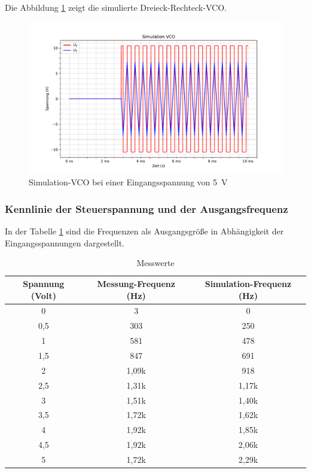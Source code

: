 Die Abbildung \ref{fig:VCO_5Volt_Simulation} zeigt die simulierte Dreieck-Rechteck-VCO.

\begin{figure}[H]
  \centering
  \includegraphics[width=0.8\linewidth]{Elektronik-Laborprotokoll_PLL/Plots/simulation-vco-5V.pdf}
  \caption{Simulation-VCO bei einer Eingangsspannung von \SI{5}{\volt}}
  \label{fig:VCO_5Volt_Simulation}
\end{figure}

\subsubsection{Kennlinie der Steuerspannung und der Ausgangsfrequenz}


In der Tabelle \ref{tab:VCO_Kennlinie_gemessen} sind die Frequenzen als Ausgangsgröße in Abhängigkeit der Eingangsspannungen dargestellt.


\begin{table}[htbp]
  \centering
  \caption{Messwerte}
  \label{tab:VCO_Kennlinie_gemessen}
  \begin{tabular}{ccc}
    \toprule
    Spannung (Volt) & Messung-Frequenz (Hz)&Simulation-Frequenz (Hz)\\
    \midrule
    0 & 3 & 0\\
    0,5 & 303 & 250\\
    1 & 581 & 478\\
    1,5 & 847 &691\\
    2 & 1,09k & 918 \\
    2,5 & 1,31k & 1,17k\\
    3 & 1,51k& 1,40k \\
    3,5 & 1,72k & 1,62k\\
    4 & 1,92k& 1,85k\\
    4,5 & 1,92k & 2,06k \\
    5 & 1,72k& 2,29k\\
    \bottomrule
  \end{tabular}
\end{table}

